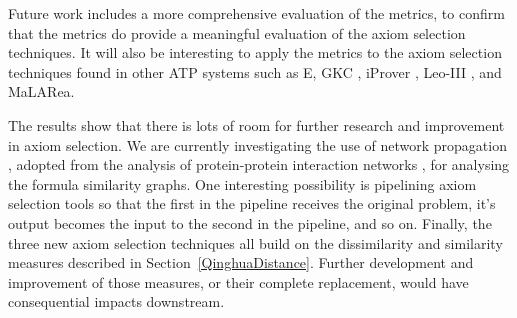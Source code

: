 \documentclass[EPiC]{easychair}
\begin{document}
Future work includes a more comprehensive evaluation of the metrics, to
confirm that the metrics do provide a meaningful evaluation of the axiom
selection techniques.
It will also be interesting to apply the metrics to the axiom selection
techniques found in other ATP systems such as E, GKC \cite{Tam19},
iProver \cite{Kor08}, Leo-III \cite{SB18}, and MaLARea.

The results show that there is lots of room for further research and 
improvement in axiom selection.
We are currently investigating the use of network propagation \cite{SY07}, 
adopted from the analysis of protein-protein interaction networks
\cite{DD+20}, for analysing the formula similarity graphs.  
One interesting possibility is pipelining axiom selection tools so that
the first in the pipeline receives the original problem, it's output
becomes the input to the second in the pipeline, and so on.
Finally, the three new axiom selection techniques all build on the
dissimilarity and similarity measures described in 
Section~\ref{QinghuaDistance}.
Further development and improvement of those measures, or their complete
replacement, would have consequential impacts downstream.

\label{sect:bib}


\end{document}
